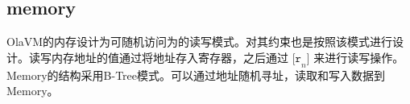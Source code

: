 \subsection{memory}\label{subsec: processor-memory}
OlaVM的内存设计为可随机访问为的读写模式。对其约束也是按照该模式进行设计。读写内存地址的值通过将地址存入寄存器，之后通过 $\texttt{[r}_n\texttt{]}$ 来进行读写操作。
Memory的结构采用B-Tree模式。可以通过地址随机寻址，读取和写入数据到Memory。